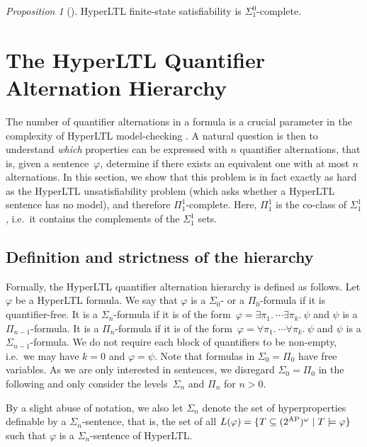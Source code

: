 \documentclass[dvipsnames,10pt,a4paper]{amsart}
\theoremstyle{definition}
\theoremstyle{remark}
\newtheorem{propC}[thm]{Proposition}
\newcommand{\hyltl}{{HyperLTL}\xspace}
\newcommand\AP{\textup{AP}}
\begin{document}
\begin{propC}[\cite{FinkbeinerRS15,FinkbeinerH16}]
\label{prop_hyltlfs}
\hyltl finite-state satisfiability is $\Sigma_1^0$-complete.
\end{propC}


\section{The \texorpdfstring{\hyltl}{HyperLTL} Quantifier Alternation Hierarchy}
\label{sec:hierarchy}
The number of quantifier alternations in
a formula is a crucial parameter in the complexity of \hyltl model-checking
\cite{FinkbeinerRS15,Rabe16}.
A natural question is then to understand \emph{which} properties
can be expressed with $n$ quantifier alternations, that is, given
a sentence~$\varphi$, determine if there exists an equivalent one with at
most $n$ alternations.
In this section, we show that this problem is in fact exactly as hard as the
\hyltl unsatisfiability problem (which asks whether a \hyltl sentence has no model),
and therefore $\Pi^1_1$-complete. Here, $\Pi_1^1$ is the co-class of $\Sigma_1^1$, i.e.\ it contains the complements of the $\Sigma_1^1$ sets.


\subsection{Definition and strictness of the hierarchy}

Formally, the \hyltl quantifier alternation hierarchy is defined as follows.
Let $\varphi$ be a \hyltl formula. We say that $\varphi$ is a $\Sigma_0$- or
a $\Pi_0$-formula if it is quantifier-free. It is a $\Sigma_n$-formula
if it is of the form~$\varphi = \exists \pi_1.\  \cdots \exists \pi_k.\ \psi$
and $\psi$ is a $\Pi_{n-1}$-formula. It is a $\Pi_n$-formula if
it is of the form~$\varphi = \forall \pi_1.\ \cdots \forall \pi_k.\ \psi$ and
$\psi$ is a $\Sigma_{n-1}$-formula.
We do not require each block of quantifiers to be non-empty, i.e.\ we may have
$k=0$ and $\varphi = \psi$.
Note that formulas in $\Sigma_0 = \Pi_0$ have free variables.
As we are only interested in sentences, we disregard $\Sigma_0 = \Pi_0$ in the following and only consider the levels~$\Sigma_n $ and $ \Pi_n$ for $n>0$.


By a slight abuse of notation, we also let $\Sigma_n$ denote the set of hyperproperties
definable by a $\Sigma_n$-sentence, that is, the set of all 
$L(\varphi) = \{ T \subseteq (2^\AP)^\omega \mid T \models \varphi\}$
such that $\varphi$ is a $\Sigma_n$-sentence of \hyltl.
\end{document}
